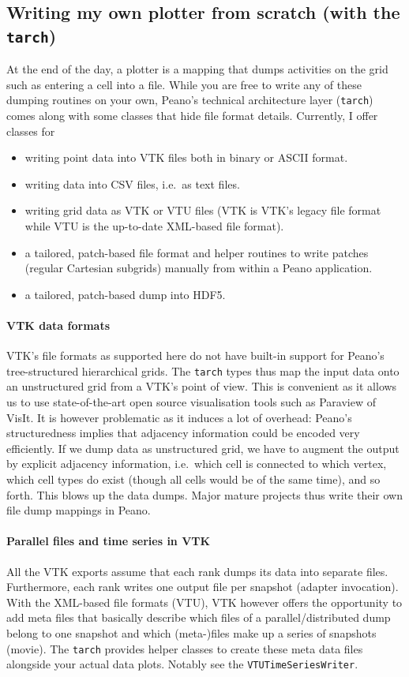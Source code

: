 \subsection{Writing my own plotter from scratch (with the \texttt{tarch})}

At the end of the day, a plotter is a mapping that dumps activities on the
grid such as entering a cell into a file.
While you are free to write any of these dumping routines on your own, Peano's
technical architecture layer (\texttt{tarch}) comes along with some classes that
hide file format details.
Currently, I offer classes for

\begin{itemize}
  \item writing point data into VTK files both in binary or ASCII format.
  \item writing data into CSV files, i.e.~as text files.
  \item writing grid data as VTK or VTU files (VTK is VTK's legacy file format
  while VTU is the up-to-date XML-based file format).
  \item a tailored, patch-based file format and helper routines to write
  patches (regular Cartesian subgrids) manually from within a Peano application.
  \item a tailored, patch-based dump into HDF5.
\end{itemize}


\paragraph{VTK data formats}
VTK's file formats as supported here do not have built-in support for Peano's
tree-structured hierarchical grids.
The \texttt{tarch} types thus map the input data onto an unstructured grid from
a VTK's point of view.
This is convenient as it allows us to use state-of-the-art open source
visualisation tools such as Paraview of VisIt.
It is however problematic as it induces a lot of overhead: Peano's
structuredness implies that adjacency information could be encoded very
efficiently.
If we dump data as unstructured grid, we have to augment the output by explicit
adjacency information, i.e.~which cell is connected to which vertex, which cell
types do exist (though all cells would be of the same time), and so forth.
This blows up the data dumps.
Major mature projects thus write their own file dump mappings in Peano.


\paragraph{Parallel files and time series in VTK}
All the VTK exports assume that each rank dumps its data into separate files.
Furthermore, each rank writes one output file per snapshot (adapter invocation).
With the XML-based file formats (VTU), VTK however offers the opportunity to add
meta files that basically describe which files of a parallel/distributed dump
belong to one snapshot and which (meta-)files make up a series of snapshots
(movie).
The \texttt{tarch} provides helper classes to create these meta data files
alongside your actual data plots.
Notably see the \texttt{VTUTimeSeriesWriter}.



